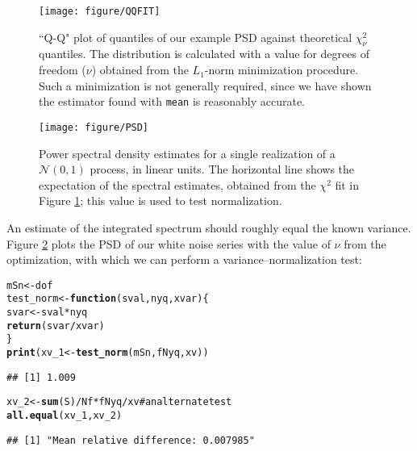 \documentclass[10pt]{article}\usepackage{graphicx, color}
\makeatletter
\def\maxwidth{ %
  \ifdim\Gin@nat@width>\linewidth
    \linewidth
  \else
    \Gin@nat@width
  \fi
}
\newcommand{\hlfunctioncall}[1]{\textcolor[rgb]{0.501960784313725,0,0.329411764705882}{\textbf{#1}}}%
\newcommand{\hlcomment}[1]{\textcolor[rgb]{0.180392156862745,0.6,0.341176470588235}{#1}}%
\newenvironment{kframe}{%
 \def\at@end@of@kframe{}%
 \ifinner\ifhmode%
  \def\at@end@of@kframe{\end{minipage}}%
  \begin{minipage}{\columnwidth}%
 \fi\fi%
 \def\FrameCommand##1{\hskip\@totalleftmargin \hskip-\fboxsep
 \colorbox{shadecolor}{##1}\hskip-\fboxsep
     \hskip-\linewidth \hskip-\@totalleftmargin \hskip\columnwidth}%
 \MakeFramed {\advance\hsize-\width
   \@totalleftmargin\z@ \linewidth\hsize
   \@setminipage}}%
 {\par\unskip\endMakeFramed%
 \at@end@of@kframe}
\newenvironment{knitrout}{}{} %
\newcommand{\Rcmd}[1]{\texttt{#1}}
\makeatother
\begin{document}
\begin{figure}[htb!]
\begin{center}
\begin{knitrout}
\color{fgcolor}
\texttt{[image: figure/QQFIT]} 

\end{knitrout}

\caption{``Q-Q" plot of 
quantiles of our example PSD
 against
 theoretical $\chi^2_\nu$ quantiles.  The distribution is calculated
with a value for degrees of freedom ($\nu$) obtained from the
$L_1$-norm minimization procedure.  Such a minimization is not
generally required, since we have shown the estimator found with \Rcmd{mean}
is reasonably accurate.}
\label{fig:qqchi}
\end{center}
\end{figure}

\begin{figure}[htb!]
\begin{center}
\begin{knitrout}
\color{fgcolor}
\texttt{[image: figure/PSD]} 

\end{knitrout}

\caption{Power spectral density estimates for a single realization of a 
$\mathcal{N}(0,1)$ process, in linear units.  
The horizontal line shows the expectation of the spectral estimates, obtained
from the $\chi^2$ fit in Figure \ref{fig:qqchi}; this value is
used to test normalization.}
\label{fig:psdN}
\end{center}
\end{figure}

An estimate of the integrated spectrum
should roughly equal the known variance.
Figure \ref{fig:psdN} plots the PSD of our white noise series with
the value of $\nu$ from the optimization, 
with which we can perform a variance--normalization
test:
\begin{knitrout}
\color{fgcolor}\begin{kframe}
\begin{alltt}
mSn <- dof
test_norm <- \hlfunctioncall{function}(sval, nyq, xvar) \{
    svar <- sval * nyq
    \hlfunctioncall{return}(svar/xvar)
\}
\hlfunctioncall{print}(xv_1 <- \hlfunctioncall{test_norm}(mSn, fNyq, xv))
\end{alltt}
\begin{verbatim}
## [1] 1.009
\end{verbatim}
\begin{alltt}
xv_2 <- \hlfunctioncall{sum}(S)/Nf * fNyq/xv  \hlcomment{# an alternate test}
\hlfunctioncall{all.equal}(xv_1, xv_2)
\end{alltt}
\begin{verbatim}
## [1] "Mean relative difference: 0.007985"
\end{verbatim}
\end{kframe}
\end{knitrout}
\end{document}
